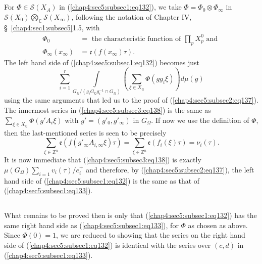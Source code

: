 \subsection{}\label{chap4:sec5:subsec3} %

For $\Phi\in\mathscr{S}(X_{A})$ in (\ref{chap4:sec5:subsec1:eq132}), we take
$\Phi=\Phi_{0}\otimes \Phi_{\infty}$ in
$\mathscr{S}(X_{0})\bigotimes\limits_{\mathbb{C}}\mathscr{S}(X_{\infty})$,
following the notation of Chapter IV, \S\ \ref{chap4:sec1:subsec5}1.5, with 
\begin{align*}
\Phi_{0} &= \text{ the characteristic function of }
\prod_{p}X^{0}_{p}\text{ and }\\
\Phi_{\infty}(x_{\infty}) &= \mathfrak{e}(f(x_{\infty})\tau).
\end{align*}\pageoriginale
The left hand side of (\ref{chap4:sec5:subsec1:eq132}) becomes just
\begin{equation*}
  \sum^{r}_{i=1}\int\limits_{G_{\Omega}/(g_{i}G_{\mathbb{Q}}g^{-1}_{i}\cap
    G_{\Omega})}\left(\sum_{\xi\in
    X_{\mathbb{Q}}}\Phi(gg_{i}\xi)\right)d\mu(g)
  \tag{138}\label{chap4:sec5:subsec3:eq138} 
\end{equation*}
using the same arguments that led us to the proof of
(\ref{chap4:sec5:subsec2:eq137}). The
innermost series in (\ref{chap4:sec5:subsec3:eq138}) is the same as $\sum\limits_{\xi\in
  X_{\mathbb{Q}}}\Phi(g'A_{i}\xi)$ with $g'=(g'_{0},g'_{\infty})$ in
$G_{\Omega}$. If now we use the definition of $\Phi$, then the
last-mentioned series is seen to be precisely
$$
\sum_{\xi\in\mathbb{Z}^n}\mathfrak{e}(f(g'_{\infty}A_{i,\infty}\xi)\tau)=\sum_{\xi\in
  \mathbb{Z}^{n}}\mathfrak{e}(f_{i}(\xi)\tau)=\nu_{i}(\tau). 
$$
It is now immediate that (\ref{chap4:sec5:subsec3:eq138}) is exactly
$\mu(G_{\Omega})\sum\limits_{i=1}v_{i}(\tau)/e_{i}^{+}$ and
therefore, by (\ref{chap4:sec5:subsec2:eq137}), the left hand side of
(\ref{chap4:sec5:subsec1:eq132}) is the same as that of
(\ref{chap4:sec5:subsec1:eq133}).

\subsection{}\label{chap4:sec5:subsec4}%

What remains to be proved then is only that
(\ref{chap4:sec5:subsec1:eq132}) has the same
right hand side as (\ref{chap4:sec5:subsec1:eq133}), for $\Phi$ as chosen as above. Since
$\Phi(0)=1$, we are reduced to showing that the series on the right
hand side of (\ref{chap4:sec5:subsec1:eq132}) is identical with the
series over $(c,d)$ in (\ref{chap4:sec5:subsec1:eq133}). 

